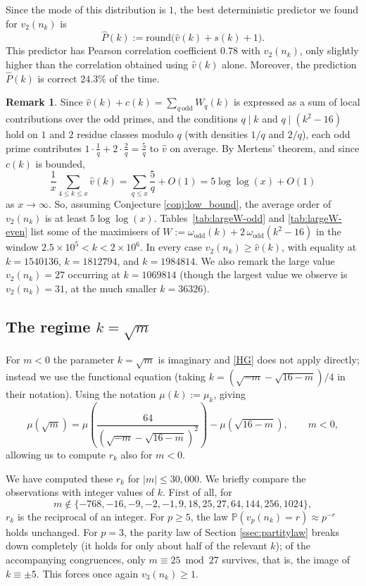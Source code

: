 \documentclass[12pt]{amsart}%
\newcommand{\1}{\mathds{1}}
\theoremstyle{definition}
\newtheorem{rem}[thm]{Remark}
\numberwithin{equation}{section}
\numberwithin{table}{section}
\numberwithin{figure}{section}
\begin{document}
Since the mode of this distribution is $1$, the best deterministic predictor we found for $v_2(n_k)$ is
\begin{equation}\label{eq:P}
\hat{P}(k):=\mathrm{round}\bigl(\hat{v}(k)+s(k)+1\bigr).
\end{equation}
This predictor has Pearson correlation coefficient $0.78$ with $v_2(n_k)$, only slightly higher than the correlation obtained using $\hat{v}(k)$ alone. Moreover, the prediction $\hat{P}(k)$ is correct $24.3\%$ of the time.


\begin{rem}
Since $\hat v(k) + c(k) = \sum_{q\ \mathrm{odd}} W_q(k)$ is  expressed as a sum of local contributions over the odd primes, and the conditions
$q\mid k$ and $q\mid (k^2-16)$ hold on $1$ and $2$ residue classes modulo $q$
(with densities $1/q$ and $2/q$), each odd prime contributes
$1\cdot\tfrac1q + 2\cdot\tfrac2q = \tfrac5q$ to $\hat v$ on average. By Mertens'
theorem, and since $c(k)$ is bounded,
\[
  \frac1x\sum_{4\le k\le x}\hat v(k) = \sum_{q\le x}\frac5q + O(1)
  = 5\log\log (x) + O(1)
\]
as $x \to \infty$.  So, assuming Conjecture \ref{conj:low_bound}, the average order of $v_2(n_k)$ is at least $5 \log \log (x)$. Tables~\ref{tab:largeW-odd} and \ref{tab:largeW-even} list some of the  maximisers of $W := \omega_{\mathrm{odd}}(k)+2\,\omega_{\mathrm{odd}}(k^2-16)$ in the window
$2.5\times10^{5}<k<2\times10^{6}$. In every case $v_2(n_k) \geq  \hat{v}(k)$, with equality  at $k = 1540136$, $k=1812794$, and $k=1984814$. We also remark the large value $v_2(n_k)=27$ occurring at $k=1069814$ (though the largest value we observe is $v_2(n_k) = 31$, at the much smaller $k = 36326$).%

\end{rem}

\subsection{The regime $k=\sqrt m$}
\label{sec:sqrtm}

For $m < 0$ the parameter $k = \sqrt{m}$ is imaginary and \eqref{HG} does not apply directly; instead we use the functional equation \cite[Theorem~2.2]{LR07} (taking $k=(\sqrt{-m}-\sqrt{16-m})/4$ in their notation).
Using the notation $\mu(k):=\mu_k$, giving
\[\mu(\sqrt m)=\mu\!\left(\frac{64}{(\sqrt{-m}-\sqrt{16-m})^2}\right)-\mu(\sqrt{16-m}),\qquad m<0,\]
allowing us to compute $r_k$ also for $m<0$.

We have computed these $r_k$ for $|m| \leq 30{,}000$. We briefly compare the observations with integer values of $k$. First of all, for
\[
m \not \in \{ -768, -16, -9, -2, -1, 9, 18, 25, 27, 64, 144, 256 , 1024\},
\]
$r_k$ is the reciprocal of an integer.
For $p\ge5$, the law $\mathbb P(v_p(n_k)=r)\approx p^{-r}$ holds unchanged.
 For $p=3$, the parity law of Section \ref{ssec:partitylaw} breaks down completely (it holds
for only about half of the relevant $k$); of the accompanying congruences, only
$m\equiv25\bmod27$ survives, that is, the image of $k\equiv\pm5$. This forces once again $v_3(n_k)\ge1$.
\end{document}

